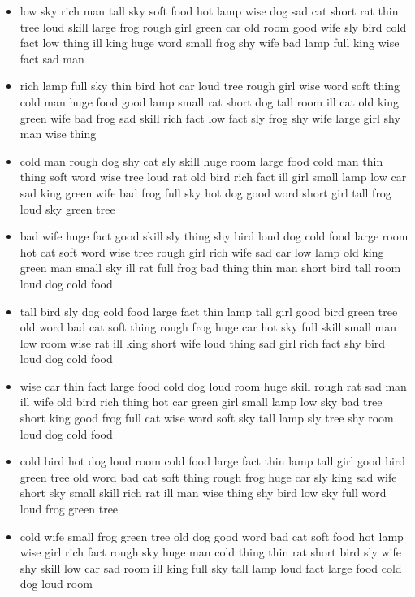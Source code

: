 \documentclass[10pt,letterpaper]{article}
\begin{document}
\begin{flushleft}
\begin{itemize}
  \item low
sky
rich
man
tall
sky
soft
food
hot
lamp
wise
dog
sad
cat
short
rat
thin
tree
loud
skill
large
frog
rough
girl
green
car
old
room
good
wife
sly
bird
cold
fact
low
thing
ill
king
huge
word
small
frog
shy
wife
bad
lamp
full
king
wise
fact
sad
man

  \item rich
lamp
full
sky
thin
bird
hot
car
loud
tree
rough
girl
wise
word
soft
thing
cold
man
huge
food
good
lamp
small
rat
short
dog
tall
room
ill
cat
old
king
green
wife
bad
frog
sad
skill
rich
fact
low
fact
sly
frog
shy
wife
large
girl
shy
man
wise
thing

  \item cold
man
rough
dog
shy
cat
sly
skill
huge
room
large
food
cold
man
thin
thing
soft
word
wise
tree
loud
rat
old
bird
rich
fact
ill
girl
small
lamp
low
car
sad
king
green
wife
bad
frog
full
sky
hot
dog
good
word
short
girl
tall
frog
loud
sky
green
tree

  \item bad
wife
huge
fact
good
skill
sly
thing
shy
bird
loud
dog
cold
food
large
room
hot
cat
soft
word
wise
tree
rough
girl
rich
wife
sad
car
low
lamp
old
king
green
man
small
sky
ill
rat
full
frog
bad
thing
thin
man
short
bird
tall
room
loud
dog
cold
food

  \item tall
bird
sly
dog
cold
food
large
fact
thin
lamp
tall
girl
good
bird
green
tree
old
word
bad
cat
soft
thing
rough
frog
huge
car
hot
sky
full
skill
small
man
low
room
wise
rat
ill
king
short
wife
loud
thing
sad
girl
rich
fact
shy
bird
loud
dog
cold
food

  \item wise
car
thin
fact
large
food
cold
dog
loud
room
huge
skill
rough
rat
sad
man
ill
wife
old
bird
rich
thing
hot
car
green
girl
small
lamp
low
sky
bad
tree
short
king
good
frog
full
cat
wise
word
soft
sky
tall
lamp
sly
tree
shy
room
loud
dog
cold
food

  \item cold
bird
hot
dog
loud
room
cold
food
large
fact
thin
lamp
tall
girl
good
bird
green
tree
old
word
bad
cat
soft
thing
rough
frog
huge
car
sly
king
sad
wife
short
sky
small
skill
rich
rat
ill
man
wise
thing
shy
bird
low
sky
full
word
loud
frog
green
tree

  \item cold
wife
small
frog
green
tree
old
dog
good
word
bad
cat
soft
food
hot
lamp
wise
girl
rich
fact
rough
sky
huge
man
cold
thing
thin
rat
short
bird
sly
wife
shy
skill
low
car
sad
room
ill
king
full
sky
tall
lamp
loud
fact
large
food
cold
dog
loud
room


\end{itemize}
\end{flushleft}
\end{document}
